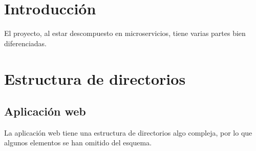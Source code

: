 
\section{Introducción}

El proyecto, al estar descompuesto en microservicios, tiene varias partes bien diferenciadas.

\section{Estructura de directorios}


\subsection{Aplicación web}
La aplicación web tiene una estructura de directorios algo compleja, por lo que algunos elementos se han omitido del esquema.

